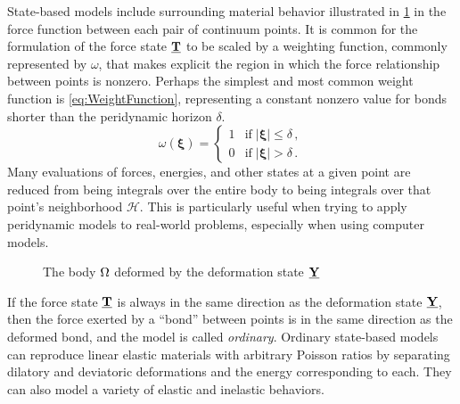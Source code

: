 State-based models include surrounding material behavior illustrated in \cref{fig:pdDeformed} in the force function between each pair of continuum points. 
It is common for the formulation of the force state $\vstate{T}{}{}$ to be scaled by a weighting function, commonly represented by $\omega$, that makes explicit the region in which the force relationship between points is nonzero.
Perhaps the simplest and most common weight function is \cref{eq:WeightFunction}, representing a constant nonzero value for bonds shorter than the peridynamic horizon $\delta$.
%
\begin{equation}
\label{eq:WeightFunction}
\omega(\boldsymbol{\xi}) = 
\begin{cases}
1 & \text{if}\; |\boldsymbol{\xi}| \leq \delta\,, \\
0 & \text{if}\; |\boldsymbol{\xi}| > \delta\,.
\end{cases}
\end{equation}
%
Many evaluations of forces, energies, and other states at a given point are reduced from being integrals over the entire body to being integrals over that point's neighborhood $\mathcal{H}$.
This is particularly useful when trying to apply peridynamic models to real-world problems, especially when using computer models. 
%
\begin{figure}[h]
  \centering
{}
\caption{The body \protect\(\protect\Omega\protect\) deformed by the deformation state \protect\(\protect\vstate{Y}{}{}\protect\)}
\label{fig:pdDeformed}
\end{figure}
%
If the force state $\vstate{T}{}{}$ is always in the same direction as the deformation state $\vstate{Y}{}{}$, then the force exerted by a ``bond'' between points is in the same direction as the deformed bond, and the model is called \textit{ordinary}.  
Ordinary state-based models can reproduce linear elastic materials with arbitrary Poisson ratios by separating dilatory and deviatoric deformations and the energy corresponding to each.
They can also model a variety of elastic and inelastic behaviors.

